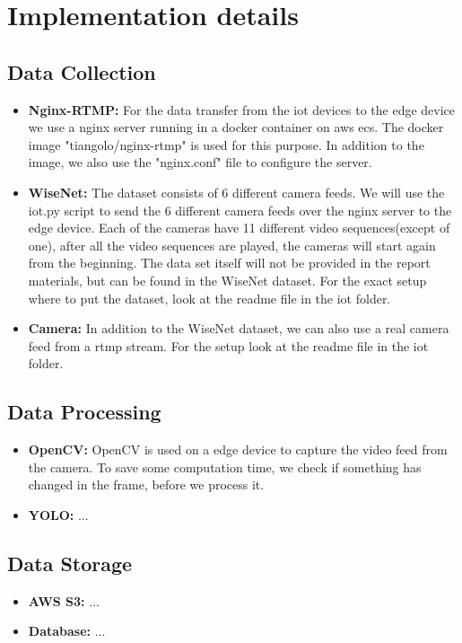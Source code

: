 \documentclass[conference]{IEEEtran}
\begin{document}
\section{Implementation details}
\subsection{Data Collection}
\begin{itemize}
    \item \textbf{Nginx-RTMP:} For the data transfer from the iot devices to the edge device we use a nginx server running in a docker container on aws ecs.
                                The docker image "tiangolo/nginx-rtmp" is used for this purpose. In addition to the image, we also use the "nginx.conf" file to configure the server.
    \item \textbf{WiseNet:} The dataset consists of 6 different camera feeds. We will use the iot.py script to send the 6 different camera feeds over the nginx server to the edge device.
                            Each of the cameras have 11 different video sequences(except of one), after all the video sequences are played, the cameras will start again from the beginning.
                            The data set itself will not be provided in the report materials, but can be found in the WiseNet dataset. For the exact setup where to put the dataset, look at the readme file in the iot folder.     
    \item \textbf{Camera:} In addition to the WiseNet dataset, we can also use a real camera feed from a rtmp stream. For the setup look at the readme file in the iot folder.
\end{itemize}
\subsection{Data Processing}
\begin{itemize}
    \item \textbf{OpenCV:} OpenCV is used on a edge device to capture the video feed from the camera. To save some
    computation time, we check if something has changed in the frame, before we process it. 
    \item \textbf{YOLO:} ...
\end{itemize}
\subsection{Data Storage}
\begin{itemize}
    \item \textbf{AWS S3:} ...
    \item \textbf{Database:} ...
\end{itemize}
\end{document}
